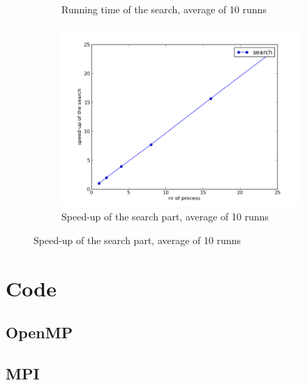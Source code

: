 \documentclass[a4paper,10pt]{article}
\begin{document}
\begin{figure}[h!]
\begin{subfigure}[b]{0.48\textwidth}
                \caption{Running time of the search, average of 10 runns}
                \label{fig:tiger}
        \end{subfigure}
        \begin{subfigure}[b]{0.48\textwidth}
                \centering
                \includegraphics[width=\textwidth]{graphics/mpi_search_speedup.png}
                \caption{Speed-up of the search part, average of 10 runns}
                \label{fig:a}
        \end{subfigure}
\end{figure}
\clearpage
\appendix
\section{Code}
%    
  \subsection{OpenMP}
       
  \subsection{MPI}
     
\end{document}
